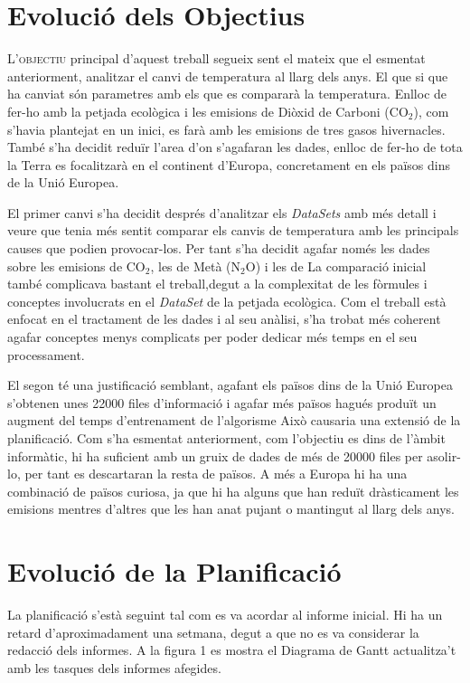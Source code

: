 \documentclass[10pt,a4paper,twocolumn,twoside]{article}
\begin{document}
\section{Evolució dels Objectius}
\lettrine[lines=3]{L}{'objectiu} principal d'aquest treball segueix sent el mateix que el esmentat anteriorment, analitzar el canvi de temperatura al llarg dels anys. El que si que ha canviat són parametres amb els que es compararà la temperatura. Enlloc de fer-ho amb la petjada ecològica i les emisions de Diòxid de Carboni (CO$_2$), com s'havia plantejat en un inici, es farà amb les emisions de tres gasos hivernacles. També s'ha decidit reduïr l'area d'on s'agafaran les dades, enlloc de fer-ho de tota la Terra es focalitzarà en el continent d'Europa, concretament en els països dins de la Unió Europea.

El primer canvi s'ha decidit després d'analitzar els \textit{DataSets} amb més detall i veure que tenia més sentit comparar els canvis de temperatura amb les principals causes que podien provocar-los. Per tant s'ha decidit agafar només les dades sobre les emisions de  CO$_2$, les de Metà (N$_2$O) i les de  La comparació inicial també complicava bastant el treball,degut a la complexitat de les fòrmules i conceptes involucrats en el \textit{DataSet} de  la petjada ecològica. Com el treball està enfocat en el tractament de les dades i al seu anàlisi, s'ha trobat més coherent agafar conceptes menys complicats per  poder dedicar més temps en el seu processament. 

El segon té una justificació semblant, agafant els països dins de la Unió Europea s'obtenen unes 22000 files d'informació i agafar més països hagués produït un augment del temps d'entrenament de l'algorisme Això causaria una extensió de la planificació. Com s'ha esmentat anteriorment, com l'objectiu es dins de l'àmbit informàtic, hi ha suficient amb un gruix de dades de més de 20000 files per asolir-lo, per tant es descartaran la resta de països. A més a Europa hi ha una combinació de països curiosa, ja que hi ha alguns que han reduït dràsticament les emisions mentres d'altres que les han anat pujant o mantingut al llarg dels anys. 

\section{ Evolució de la Planificació}
La planificació s'està seguint tal com es va acordar al informe inicial. Hi ha un retard d'aproximadament una setmana, degut a que no es va considerar la redacció dels informes. A la figura 1 es mostra el Diagrama de Gantt actualitza't amb les tasques dels informes afegides. 
\end{document}
